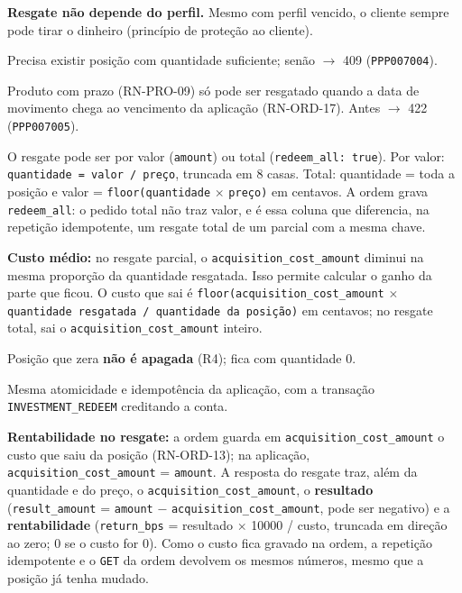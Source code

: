 \documentclass[11pt,a4paper]{article}
\newcommand{\obr}{\textbf{[OBR]}}          %
\newcommand{\dec}{\textbf{[DEC]}}          %
\newcommand{\tb}[1]{\texttt{#1}}           %
\begin{document}
\begin{regras}
  \item[RN-ORD-09 \dec] \textbf{Resgate não depende do perfil.} Mesmo com perfil vencido, o cliente
  sempre pode tirar o dinheiro (princípio de proteção ao cliente).
  \item[RN-ORD-10 \obr] Precisa existir posição com quantidade suficiente; senão $\to$ 409
  (\tb{PPP007004}).
  \item[RN-ORD-11 \dec] Produto com prazo (RN-PRO-09) só pode ser resgatado quando a data de
  movimento chega ao vencimento da aplicação (RN-ORD-17). Antes $\to$ 422 (\tb{PPP007005}).
  \item[RN-ORD-12 \dec] O resgate pode ser por valor (\tb{amount}) ou total
  (\tb{redeem_all: true}). Por valor: \tb{quantidade = valor / preço}, truncada em 8 casas. Total:
  quantidade = toda a posição e valor = \tb{floor(quantidade} $\times$ \tb{preço)} em centavos.
  A ordem grava \tb{redeem_all}: o pedido total não traz valor, e é essa coluna que diferencia, na
  repetição idempotente, um resgate total de um parcial com a mesma chave.
  \item[RN-ORD-13 \dec] \textbf{Custo médio:} no resgate parcial, o \tb{acquisition_cost_amount} diminui na
  mesma proporção da quantidade resgatada. Isso permite calcular o ganho da parte que ficou.
  O custo que sai é \tb{floor(acquisition_cost_amount} $\times$ \tb{quantidade resgatada / quantidade da
  posição)} em centavos; no resgate total, sai o \tb{acquisition_cost_amount} inteiro.
  \item[RN-ORD-14 \obr] Posição que zera \textbf{não é apagada} (R4); fica com quantidade 0.
  \item[RN-ORD-15 \obr] Mesma atomicidade e idempotência da aplicação, com a transação
  \tb{INVESTMENT_REDEEM} creditando a conta.
  \item[RN-ORD-16 \dec] \textbf{Rentabilidade no resgate:} a ordem guarda em \tb{acquisition_cost_amount} o
  custo que saiu da posição (RN-ORD-13); na aplicação, \tb{acquisition_cost_amount} = \tb{amount}. A resposta
  do resgate traz, além da quantidade e do preço, o \tb{acquisition_cost_amount}, o \textbf{resultado}
  (\tb{result_amount} = \tb{amount} $-$ \tb{acquisition_cost_amount}, pode ser negativo) e a
  \textbf{rentabilidade} (\tb{return_bps} = resultado $\times$ 10000 / custo, truncada em direção
  ao zero; 0 se o custo for 0). Como o custo fica gravado na ordem, a repetição idempotente e o
  \tb{GET} da ordem devolvem os mesmos números, mesmo que a posição já tenha mudado.
\end{regras}
\end{document}
